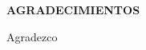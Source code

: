 \begin{center}
{\large{\bf{AGRADECIMIENTOS}}}
\end{center}


\noindent
 Agradezco

\vspace{4cm} %


\clearpage